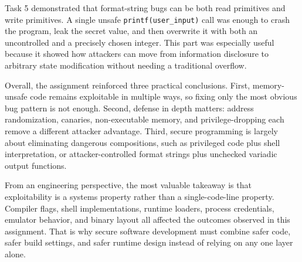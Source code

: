 \documentclass[11pt]{article}
\begin{document}
Task 5 demonstrated that format-string bugs can be both read primitives and write primitives. A single unsafe \texttt{printf(user\_input)} call was enough to crash the program, leak the secret value, and then overwrite it with both an uncontrolled and a precisely chosen integer. This part was especially useful because it showed how attackers can move from information disclosure to arbitrary state modification without needing a traditional overflow.

Overall, the assignment reinforced three practical conclusions. First, memory-unsafe code remains exploitable in multiple ways, so fixing only the most obvious bug pattern is not enough. Second, defense in depth matters: address randomization, canaries, non-executable memory, and privilege-dropping each remove a different attacker advantage. Third, secure programming is largely about eliminating dangerous compositions, such as privileged code plus shell interpretation, or attacker-controlled format strings plus unchecked variadic output functions.

From an engineering perspective, the most valuable takeaway is that exploitability is a systems property rather than a single-code-line property. Compiler flags, shell implementations, runtime loaders, process credentials, emulator behavior, and binary layout all affected the outcomes observed in this assignment. That is why secure software development must combine safer code, safer build settings, and safer runtime design instead of relying on any one layer alone.
\end{document}
